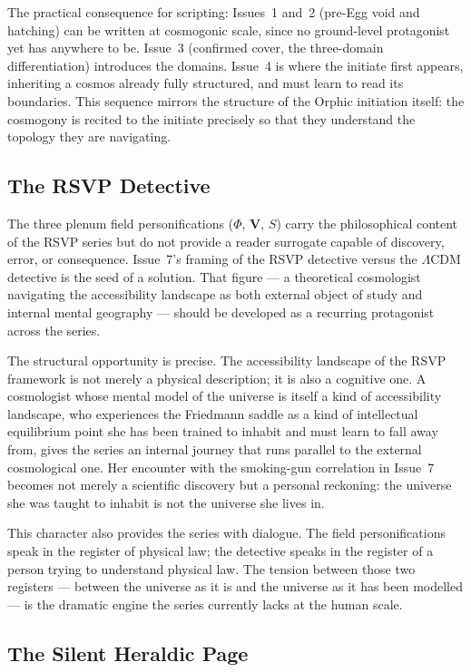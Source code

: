 \documentclass[12pt, a4paper]{article}
\begin{document}
The practical consequence for scripting: Issues~1 and~2 (pre-Egg void and hatching) can be written at cosmogonic scale, since no ground-level protagonist yet has anywhere to be. Issue~3 (confirmed cover, the three-domain differentiation) introduces the domains. Issue~4 is where the initiate first appears, inheriting a cosmos already fully structured, and must learn to read its boundaries. This sequence mirrors the structure of the Orphic initiation itself: the cosmogony is recited to the initiate precisely so that they understand the topology they are navigating.

\subsection{The RSVP Detective}

The three plenum field personifications ($\Phi$, $\mathbf{V}$, $S$) carry the philosophical content of the RSVP series but do not provide a reader surrogate capable of discovery, error, or consequence. Issue~7's framing of the RSVP detective versus the $\Lambda$CDM detective is the seed of a solution. That figure --- a theoretical cosmologist navigating the accessibility landscape as both external object of study and internal mental geography --- should be developed as a recurring protagonist across the series.

The structural opportunity is precise. The accessibility landscape of the RSVP framework is not merely a physical description; it is also a cognitive one. A cosmologist whose mental model of the universe is itself a kind of accessibility landscape, who experiences the Friedmann saddle as a kind of intellectual equilibrium point she has been trained to inhabit and must learn to fall away from, gives the series an internal journey that runs parallel to the external cosmological one. Her encounter with the smoking-gun correlation in Issue~7 becomes not merely a scientific discovery but a personal reckoning: the universe she was taught to inhabit is not the universe she lives in.

This character also provides the series with dialogue. The field personifications speak in the register of physical law; the detective speaks in the register of a person trying to understand physical law. The tension between those two registers --- between the universe as it is and the universe as it has been modelled --- is the dramatic engine the series currently lacks at the human scale.

\subsection{The Silent Heraldic Page}
\end{document}
